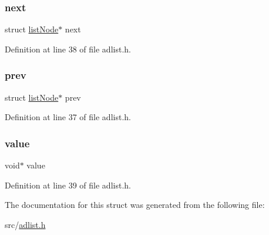 \subsubsection{\texorpdfstring{next}{next}}
{\footnotesize\ttfamily struct \hyperlink{structlist_node}{list\+Node}$\ast$ next}



Definition at line 38 of file adlist.\+h.

\mbox{\label{structlist_node_a58e66447fe4a91732b36e114d5c740bd}} 
\subsubsection{\texorpdfstring{prev}{prev}}
{\footnotesize\ttfamily struct \hyperlink{structlist_node}{list\+Node}$\ast$ prev}



Definition at line 37 of file adlist.\+h.

\mbox{\label{structlist_node_a0f61d63b009d0880a89c843bd50d8d76}} 
\subsubsection{\texorpdfstring{value}{value}}
{\footnotesize\ttfamily void$\ast$ value}



Definition at line 39 of file adlist.\+h.



The documentation for this struct was generated from the following file\+:\begin{DoxyCompactItemize}
\item 
src/\hyperlink{adlist_8h}{adlist.\+h}\end{DoxyCompactItemize}
